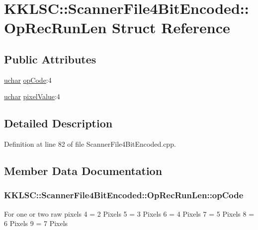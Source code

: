 \hypertarget{struct_scanner_file4_bit_encoded_1_1_op_rec_run_len}{}\section{K\+K\+L\+SC\+:\+:Scanner\+File4\+Bit\+Encoded\+:\+:Op\+Rec\+Run\+Len Struct Reference}
\label{struct_scanner_file4_bit_encoded_1_1_op_rec_run_len}
\subsection*{Public Attributes}
\begin{DoxyCompactItemize}
\item 
\hyperlink{namespace_k_k_b_ace9969169bf514f9ee6185186949cdf7}{uchar} \hyperlink{struct_scanner_file4_bit_encoded_1_1_op_rec_run_len_a8edb64dc1eab7c1ee4e4f64268dda6c9}{op\+Code}\+:4
\item 
\hyperlink{namespace_k_k_b_ace9969169bf514f9ee6185186949cdf7}{uchar} \hyperlink{struct_scanner_file4_bit_encoded_1_1_op_rec_run_len_aa452bd8fc82a219e22451aa88c3222c3}{pixel\+Value}\+:4
\end{DoxyCompactItemize}


\subsection{Detailed Description}


Definition at line 82 of file Scanner\+File4\+Bit\+Encoded.\+cpp.



\subsection{Member Data Documentation}
\subsubsection[{\texorpdfstring{op\+Code}{opCode}}]{ K\+K\+L\+S\+C\+::\+Scanner\+File4\+Bit\+Encoded\+::\+Op\+Rec\+Run\+Len\+::op\+Code}\hypertarget{struct_scanner_file4_bit_encoded_1_1_op_rec_run_len_a8edb64dc1eab7c1ee4e4f64268dda6c9}{}\label{struct_scanner_file4_bit_encoded_1_1_op_rec_run_len_a8edb64dc1eab7c1ee4e4f64268dda6c9}
For one or two raw pixels 4 = 2 Pixels 5 = 3 Pixels 6 = 4 Pixels 7 = 5 Pixels 8 = 6 Pixels 9 = 7 Pixels 

